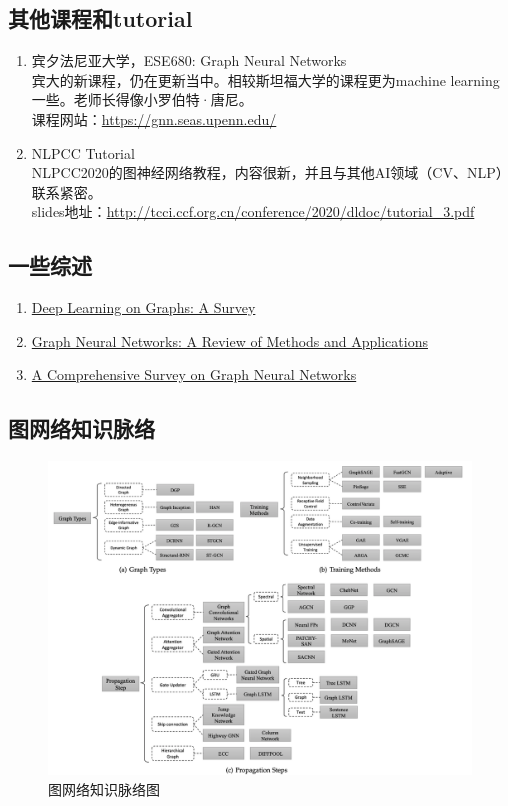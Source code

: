 \documentclass[lang=cn,11pt,a4paper]{elegant_template}
\begin{document}
\subsection{其他课程和tutorial}
\begin{enumerate}
    \item 宾夕法尼亚大学，ESE680: Graph Neural Networks \\
    宾大的新课程，仍在更新当中。相较斯坦福大学的课程更为machine learning一些。老师长得像小罗伯特·唐尼。 \\
    课程网站：\href{https://gnn.seas.upenn.edu/}{https://gnn.seas.upenn.edu/} 
    \item NLPCC Tutorial \\
    NLPCC2020的图神经网络教程，内容很新，并且与其他AI领域（CV、NLP）联系紧密。 \\
    slides地址：\href{http://tcci.ccf.org.cn/conference/2020/dldoc/tutorial_3.pdf}{http://tcci.ccf.org.cn/conference/2020/dldoc/tutorial\_3.pdf} 
\end{enumerate}

\subsection{一些综述}
\begin{enumerate}
    \item \href{https://arxiv.org/pdf/1812.04202.pdf}{Deep Learning on Graphs: A Survey}  
    \item \href{https://arxiv.org/pdf/1812.08434.pdf}{Graph Neural Networks: A Review of Methods and Applications} 
    \item \href{https://ieeexplore.ieee.org/abstract/document/9046288}{A Comprehensive Survey on Graph Neural Networks} 
\end{enumerate}

\subsection{图网络知识脉络}
\begin{figure}[htbp]
  \centering
  \includegraphics[width=1\textwidth]{image/gnn_1.png}
  \caption{图网络知识脉络图}
\end{figure}
\end{document}
